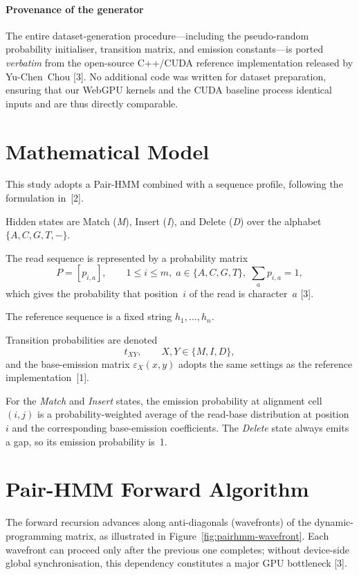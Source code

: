 \documentclass[PhD]{PHlab-thesis}
\begin{document}
\paragraph{Provenance of the generator}%
The entire dataset-generation procedure—including the pseudo-random
probability initialiser, transition matrix, and emission constants—is
ported \emph{verbatim} from the open-source C++/CUDA reference
implementation released by Yu-Chen~Chou [3].
No additional code was written for dataset preparation, ensuring that our
WebGPU kernels and the CUDA baseline process identical inputs and are thus
directly comparable.

\section{Mathematical Model}
This study adopts a Pair-HMM combined with a sequence profile, following
the formulation in~[2].

Hidden states are Match (\textit{M}), Insert (\textit{I}), and Delete
(\textit{D}) over the alphabet $\{A,C,G,T,-\}$.

The read sequence is represented by a probability matrix
\[
P=[p_{i,a}],\qquad
1\le i\le m,\;
a\in\{A,C,G,T\},\;
\sum_{a}p_{i,a}=1,
\]
which gives the probability that position~$i$ of the read is character~$a$
[3].

The reference sequence is a fixed string $h_{1},\dots,h_{n}$.

Transition probabilities are denoted
\[
t_{XY},\qquad X,Y\in\{M,I,D\},
\]
and the base-emission matrix $\varepsilon_{X}(x,y)$ adopts the same
settings as the reference implementation~[1].

For the \emph{Match} and \emph{Insert} states, the emission probability at
alignment cell~$(i,j)$ is a probability-weighted average of the read-base
distribution at position~$i$ and the corresponding base-emission
coefficients.
The \emph{Delete} state always emits a gap, so its emission probability is~1.

\section{Pair-HMM Forward Algorithm}
The forward recursion advances along anti-diagonals (wavefronts) of the
dynamic-programming matrix, as illustrated in
Figure~\ref{fig:pairhmm-wavefront}.
Each wavefront can proceed only after the previous one completes; without
device-side global synchronisation, this dependency constitutes a major
GPU bottleneck [3].
\end{document}

